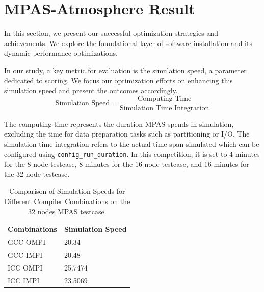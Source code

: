 \pgfplotsset{compat=1.17}

\section{MPAS-Atmosphere Result}
In this section, we present our successful optimization strategies and achievements. We explore the foundational layer of software installation and its dynamic performance optimizations.

In our study, a key metric for evaluation is the simulation speed, a parameter dedicated to scoring. We focus our optimization efforts on enhancing this simulation speed and present the outcomes accordingly. \\

\[\text{Simulation Speed} = \frac{\text{Computing Time}}{\text{Simulation Time Integration}}\]

The computing time represents the duration MPAS spends in simulation, excluding the time for data preparation tasks such as partitioning or I/O. The simulation time integration refers to the actual time span simulated which can be configured using \texttt{config\_run\_duration}. In this competition, it is set to 4 minutes for the 8-node testcase, 8 minutes for the 16-node testcase, and 16 minutes for the 32-node testcase.

\label{sec:MPAS}

\begin{table}[t]
  \centering
  \caption{Comparison of Simulation Speeds for Different Compiler Combinations on the 32 nodes MPAS testcase.}
    \begin{tabular}{ll}
        \toprule
        Combinations & Simulation Speed  \\
        \midrule
        GCC OMPI & 20.34 \\
        GCC IMPI & 20.48 \\
        ICC OMPI & 25.7474 \\
        ICC IMPI & 23.5069 \\
        \bottomrule
    \end{tabular}
    \label{tab:mpas-compiler-combo}
\end{table}

